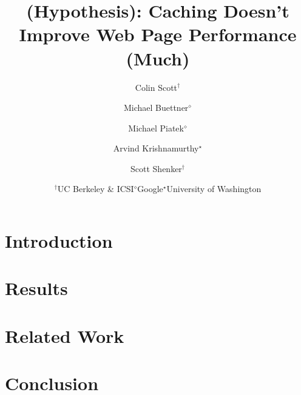 \documentclass[letterpaper,10pt,twocolumn]{article}
\title{(Hypothesis): Caching Doesn't Improve Web Page Performance (Much)}
\author{
\rm Colin Scott$^\dagger$ \hspace{-7mm}
\and \rm Michael Buettner$^\diamond$ \hspace{-7mm}
\and \rm Michael Piatek$^\diamond$ \hspace{-7mm}
\and \rm Arvind Krishnamurthy$^\star$ \hspace{-7mm}
\and \rm Scott Shenker$^\dagger$ \\
\and {\begin{tabular}{ccc}$^\dagger$UC Berkeley \& ICSI & $^\diamond$Google &
$^\star$University of Washington\end{tabular}}}
\begin{document}
   \date{}
   \maketitle
   \thispagestyle{empty}

\section{Introduction}
\label{sec:intro}


\section{Results}
\label{sec:results}


\section{Related Work}
\label{sec:related_work}


\section{Conclusion}
\label{sec:conclusion}



%

\end{document}
